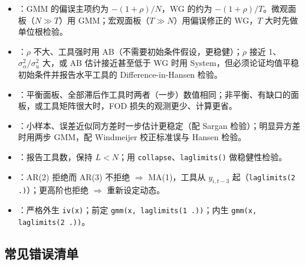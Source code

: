 \begin{itemize}
  \item {}：GMM 的偏误主项约为 $-(1+\rho)/N$，WG 的约为 $-(1+\rho)/T$。微观面板（$N\gg T$）用 GMM；宏观面板（$T\gg N$）用偏误修正的 WG，$T$ 大时先做单位根检验。
  \item {}：$\rho$ 不大、工具强时用 AB（不需要初始条件假设，更稳健）；$\rho$ 接近 1、$\sigma_\alpha^2/\sigma_u^2$ 大，或 AB 估计接近甚至低于 WG 时用 System，但必须论证均值平稳初始条件并报告水平工具的 Difference-in-Hansen 检验。
  \item {}：平衡面板、全部滞后作工具时两者（一步）数值相同；非平衡、有缺口的面板，或工具矩阵很大时，FOD 损失的观测更少、计算更省。
  \item {}：小样本、误差近似同方差时一步估计更稳定（配 Sargan 检验）；明显异方差时用两步 GMM，配 Windmeijer 校正标准误与 Hansen 检验。
  \item {}：报告工具数，保持 $L<N$；用 \texttt{collapse}、\texttt{laglimits()} 做稳健性检验。
  \item {}：AR(2) 拒绝而 AR(3) 不拒绝 $\Rightarrow$ MA(1)，工具从 $y_{i,t-3}$ 起（\texttt{laglimits(2 .)}）；更高阶也拒绝 $\Rightarrow$ 重新设定动态。
  \item {}：严格外生 \texttt{iv(x)}；前定 \texttt{gmm(x, laglimits(1 .))}；内生 \texttt{gmm(x, laglimits(2 .))}。
\end{itemize}

\subsection{常见错误清单}

